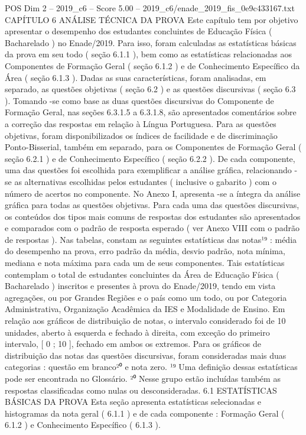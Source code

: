 \begin{textsample}{POS Dim 2 – 2019\_c6 – Score 5.00 – 2019\_c6/enade\_2019\_fis\_0e9c433167.txt}  \label{ex:f2_pos_151}
CAPÍTULO 6 ANÁLISE TÉCNICA DA PROVA Este capítulo tem por objetivo apresentar o desempenho dos estudantes concluintes de Educação Física ( Bacharelado ) no Enade/2019.
Para isso, foram calculadas as estatísticas básicas da prova em seu todo ( seção 6.1.1 ), bem como as estatísticas relacionadas aos Componentes de Formação Geral ( seção 6.1.2 ) e de Conhecimento Específico da Área ( seção 6.1.3 ).
Dadas as suas características, foram analisadas, em separado, as questões objetivas ( seção 6.2 ) e as questões discursivas ( seção 6.3 ).
Tomando -se como base as duas questões discursivas do Componente de Formação Geral, nas seções 6.3.1.5 a 6.3.1.8, são apresentados comentários sobre a correção das respostas em relação à Língua Portuguesa.
Para as questões objetivas, foram disponibilizados os índices de facilidade e de discriminação Ponto-Bisserial, também em separado, para os Componentes de Formação Geral ( seção 6.2.1 ) e de Conhecimento Específico ( seção 6.2.2 ).
De cada componente, uma das questões foi escolhida para exemplificar a análise gráfica, relacionando -se as alternativas escolhidas pelos estudantes ( inclusive o gabarito ) com o número de acertos no componente.
No Anexo I, apresenta -se a íntegra da análise gráfica para todas as questões objetivas.
Para cada uma das questões discursivas, os conteúdos dos tipos mais comuns de respostas dos estudantes são apresentados e comparados com o padrão de resposta esperado ( ver Anexo VIII com o padrão de respostas ).
Nas tabelas, constam as seguintes estatísticas das notas¹⁹ : média do desempenho na prova, erro padrão da média, desvio padrão, nota mínima, mediana e nota máxima para cada um de seus componentes.
Tais estatísticas contemplam o total de estudantes concluintes da Área de Educação Física ( Bacharelado ) inscritos e presentes à prova do Enade/2019, tendo em vista agregações, ou por Grandes Regiões e o país como um todo, ou por Categoria Administrativa, Organização Acadêmica da IES e Modalidade de Ensino.
Em relação aos gráficos de distribuição de notas, o intervalo considerado foi de 10 unidades, aberto à esquerda e fechado à direita, com exceção do primeiro intervalo, [ 0 ; 10 ], fechado em ambos os extremos.
Para os gráficos de distribuição das notas das questões discursivas, foram consideradas mais duas categorias : questão em branco²⁰ e nota zero. ¹⁹ Uma definição dessas estatísticas pode ser encontrada no Glossário. ²⁰ Nesse grupo estão incluídas também as respostas classificadas como nulas ou desconsideradas. 6.1 ESTATÍSTICAS BÁSICAS DA PROVA Esta seção apresenta estatísticas selecionadas e histogramas da nota geral ( 6.1.1 ) e de cada componente : Formação Geral ( 6.1.2 ) e Conhecimento Específico ( 6.1.3 ).

\end{textsample}
